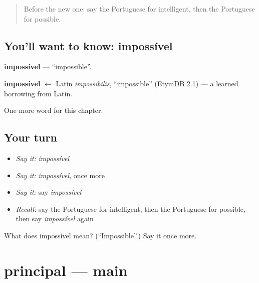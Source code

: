 \label{lesson:PT-C243-impossivel}



\begin{quote}
Before the new one: say the Portuguese for intelligent, then the Portuguese for possible.
\end{quote}

\subsection*{You'll want to know: impossível}
\textbf{impossível} — \textquotedblleft{}impossible\textquotedblright{}.

\begin{cousinweb}
\textbf{impossível} $\leftarrow$ Latin \emph{impossibilis}, \textquotedblleft{}impossible\textquotedblright{} (EtymDB 2.1) — a learned borrowing from Latin.
\end{cousinweb}

\begin{grammarlens}[title={What you've built}]
One more word for this chapter.
\end{grammarlens}

\subsection*{Your turn}
\begin{itemize}
\raggedright
  \item \emph{Say it:} \emph{impossível}
  \item \emph{Say it:} \emph{impossível}, once more
  \item \emph{Say it:} say \emph{impossível}
  \item \emph{Recall:} say the Portuguese for intelligent, then the Portuguese for possible, then say \emph{impossível} again
\end{itemize}

\begin{tcolorbox}[breakable,colback=teal!4,colframe=teal!35!black,title={Before you move on}]
What does impossível mean? (\textquotedblleft{}Impossible\textquotedblright{}.) Say it once more.
\end{tcolorbox}
\section[principal]{principal — main}

\label{lesson:PT-C243-principal}



